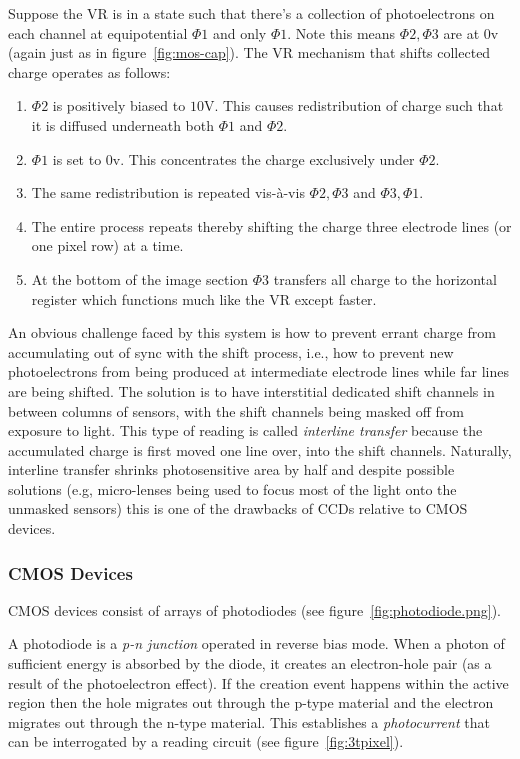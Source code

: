 Suppose the VR is in a state such that there's a collection of photoelectrons on each channel at equipotential \(\Phi1\) and only \(\Phi1\). Note this means \(\Phi2, \Phi3\) are at \(0\)v (again just as in figure~\ref{fig:mos-cap}). The VR mechanism that shifts collected charge operates as follows:
\begin{framed}
\begin{enumerate}
	\item \(\Phi2\) is positively biased to \(10\)V. This causes redistribution of charge such that it is diffused underneath both \(\Phi1\) and \(\Phi2\).
	\item \(\Phi1\) is set to \(0\)v. This concentrates the charge exclusively under \(\Phi2\).
	\item The same redistribution is repeated vis-à-vis \(\Phi2, \Phi3\) and \(\Phi3, \Phi1\).
	\item The entire process repeats thereby shifting the charge three electrode lines (or one pixel row) at a time.
	\item At the bottom of the image section \(\Phi3\) transfers all charge to the horizontal register which functions much like the VR except faster.
\end{enumerate}
\end{framed}
%
An obvious challenge faced by this system is how to prevent errant charge from accumulating out of sync with the shift process, i.e., how to prevent new photoelectrons from being produced at intermediate electrode lines while far lines are being shifted.
%
The solution is to have interstitial dedicated shift channels in between columns of sensors, with the shift channels being masked off from exposure to light.
%
This type of reading is called \textit{interline transfer} because the accumulated charge is first moved one line over, into the shift channels.
%
Naturally, interline transfer shrinks photosensitive area by half and despite possible solutions (e.g, micro-lenses being used to focus most of the light onto the unmasked sensors) this is one of the drawbacks of CCDs relative to CMOS devices.

\subsubsection{CMOS Devices}

CMOS devices consist of arrays of photodiodes (see figure~\ref{fig:photodiode.png}).

A photodiode is a \textit{p-n junction} operated in reverse bias mode.
%
When a photon of sufficient energy is absorbed by the diode, it creates an electron-hole pair (as a result of the photoelectron effect).
%
If the creation event happens within the active region then the hole migrates out through the p-type material and the electron migrates out through the n-type material.
%
This establishes a \textit{photocurrent} that can be interrogated by a reading circuit (see figure~\ref{fig:3tpixel}).

